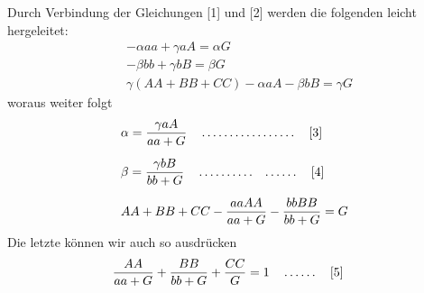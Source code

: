 Durch Verbindung der Gleichungen [1] und [2] werden die folgenden leicht hergeleitet:
\[
\begin{aligned}
&-\alpha aa+\gamma aA=\alpha G\\[6pt]
&-\beta bb+\gamma bB=\beta G\\[6pt]
&\gamma(AA+BB+CC)-\alpha aA-\beta bB=\gamma G
\end{aligned}
\]
woraus weiter folgt
\[
\begin{aligned}
&\alpha=\frac{\gamma aA}{aa+G}\quad\mathinner{.\,.\,.\,.\,.\,.\,.\,.\,.\,.\,.\,.\,.\,.\,.\,.\,.}\quad\text{[3]}\\[6pt]
&\beta=\frac{\gamma bB}{bb+G}\quad\mathinner{.\,.\,.\,.\,.\,.\,.\,.\,.\,.\quad.\,.\,.\,.\,.\,.}\quad\text{[4]}\\[6pt]
&AA+BB+CC-\frac{aaAA}{aa+G}-\frac{bbBB}{bb+G}=G
\end{aligned}
\]
Die letzte können wir auch so ausdrücken
\[
\begin{aligned}
&\frac{AA}{aa+G}+\frac{BB}{bb+G}+\frac{CC}{G}=1\quad\mathinner{.\,.\,.\,.\,.\,.}\quad\text{[5]}
\end{aligned}
\]

